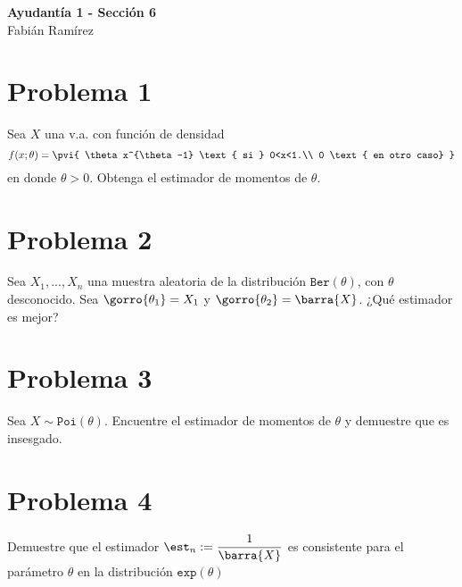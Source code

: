 \begin{center}
    \huge{
    \textbf{
        Ayudantía 1 - Sección 6
    }
    }\\
    \normalsize{
        Fabián Ramírez
    }
\end{center}
\section*{Problema 1}
Sea $X$ una v.a. con función de densidad $$f(x;\theta) = \pvi{
\theta x^{\theta-1} \text{ si } 0<x<1.\\
0 \text{ en otro caso}
}$$ en donde $\theta >0$. Obtenga el estimador de momentos de $\theta$.
\section*{Problema 2}
Sea $X_1, . . . , X_n$ una muestra aleatoria de la distribución
$\texttt{Ber}(\theta)$, con $\theta$ desconocido. Sea $\gorro{\theta_1} = X_1$ y $\gorro{\theta_2} = \barra{X}$. ¿Qué estimador es mejor?
\section*{Problema 3}
Sea $X\sim\texttt{Poi}(\theta)$. Encuentre el estimador de momentos de $\theta$ y demuestre que es insesgado.
\section*{Problema 4}
Demuestre que el estimador $\est_n := \dfrac{1}{\barra{X}}$ es consistente para el parámetro $\theta$ en la distribución $\texttt{exp}(\theta)$